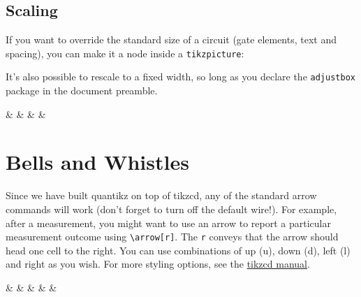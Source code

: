 \documentclass[aps,pra,10pt,nofootinbib]{revtex4-2}
\begin{document}

\subsection{Scaling}

If you want to override the standard size of a circuit (gate elements, text and spacing), you can make it a node inside a \verb!tikzpicture!:
\begin{Code}
\end{Code}
It's also possible to rescale to a fixed width, so long as you declare the \verb!adjustbox! package in the document preamble.
\begin{Code}
  \begin{adjustbox}{width=0.8\textwidth}
    \begin{quantikz}
      &  & \phase{\beta} &  &
    \end{quantikz}
  \end{adjustbox}
\end{Code}

\section{Bells and Whistles}

Since we have built quantikz on top of tikzcd, any of the standard arrow commands will work (don't forget to turn off the default wire!). For example, after a measurement, you might want to use an arrow to report a particular measurement outcome using \verb!\arrow[r]!. The \verb!r! conveys that the arrow should head one cell to the right. You can use combinations of up (u), down (d), left (l) and right as you wish. For more styling options, see the \href{http://mirrors.ctan.org/graphics/pgf/contrib/tikz-cd/tikz-cd-doc.pdf}{tikzcd manual}.
\begin{Code}
  \begin{quantikz}
     & &  & &  \arrow[r] & 
  \end{quantikz}
\end{Code}
\end{document}
